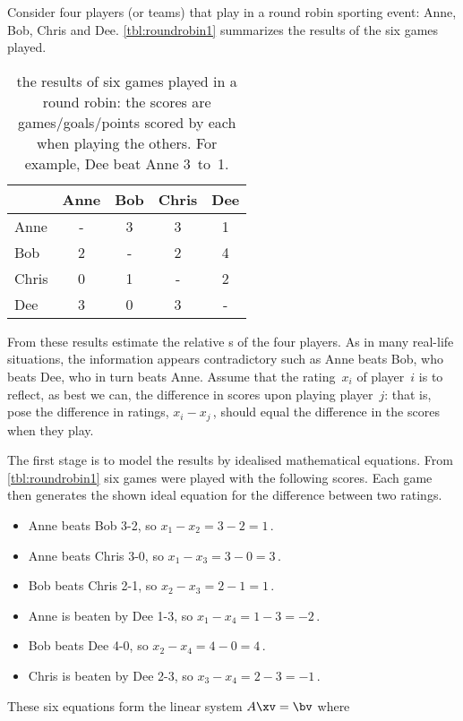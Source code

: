 \begin{example} \label{eg:roundrobin1}
Consider four players (or teams) that play in a round robin sporting event: Anne, Bob, Chris and Dee.
\autoref{tbl:roundrobin1} summarizes the results of the six games played.
\begin{table}
\caption{the results of six games played in a round robin: the scores are games\slash goals\slash points scored by each when playing the others.  For example, Dee beat Anne 3~to~1.}
\label{tbl:roundrobin1}
\begin{center}
\begin{tabular}{l|cccc} \hline
&Anne& Bob& Chris& Dee\\ \hline
Anne & - & 3 & 3 & 1 \\
Bob & 2 & - & 2 & 4 \\
Chris & 0 & 1 & - & 2 \\
Dee & 3 & 0 & 3 & - \\ \hline
\end{tabular}
\end{center}
\end{table}%
From these results estimate the relative s of the four players.
As in many real-life situations, the information appears contradictory such as Anne beats Bob, who beats Dee, who in turn beats Anne.
Assume that the rating~\(x_i\) of player~\(i\) is to reflect, as best we can, the difference in scores upon playing player~\(j\):  that is, pose the difference in ratings, \(x_i-x_j\)\,, should equal the difference in the scores when they play.
\begin{solution} 
The first stage is to model the results by idealised mathematical equations.
From \autoref{tbl:roundrobin1} six games were played with the following scores.  
Each game then generates the shown ideal equation for the difference between two ratings.
\begin{itemize}
\item Anne beats Bob 3-2, so \(x_1-x_2=3-2=1\)\,.
\item Anne beats Chris 3-0, so \(x_1-x_3=3-0=3\)\,.
\item Bob beats Chris 2-1, so \(x_2-x_3=2-1=1\)\,.
\item Anne is beaten by Dee 1-3, so \(x_1-x_4=1-3=-2\)\,.
\item Bob beats Dee 4-0, so \(x_2-x_4=4-0=4\)\,.
\item Chris is beaten by Dee 2-3, so \(x_3-x_4=2-3=-1\)\,.
\end{itemize}
These six equations form the linear system \(A\xv=\bv\) where

\end{solution}
\end{example}
